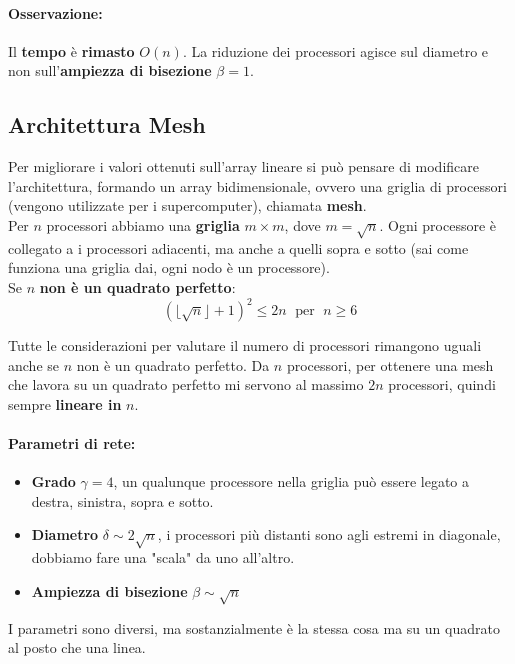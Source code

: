 \paragraph{Osservazione:} Il \textbf{tempo} è \textbf{rimasto} $O(n)$. La riduzione dei processori agisce sul diametro e non sull'\textbf{ampiezza di bisezione} $\beta = 1$.\\



\newpage

\subsection{Architettura Mesh}

Per migliorare i valori ottenuti sull'array lineare si può pensare di modificare l'architettura, formando un array bidimensionale, ovvero una griglia di processori (vengono utilizzate per i supercomputer), chiamata \textbf{mesh}.\\

Per $n$ processori abbiamo una \textbf{griglia} $m \times m$, dove $m = \sqrt n$. Ogni processore è collegato a i processori adiacenti, ma anche a quelli sopra e sotto (sai come funziona una griglia dai, ogni nodo è un processore).\\

Se $n$ \textbf{non è un quadrato perfetto}:
$$\left(\lfloor \sqrt n\rfloor + 1\right)^2 \leq 2n \; \text{ per } \; n \geq 6 $$

Tutte le considerazioni per valutare il numero di processori rimangono uguali anche se $n$ non è un quadrato perfetto. Da $n$ processori, per ottenere una mesh che lavora su un quadrato perfetto mi servono al massimo $2n$ processori, quindi sempre \textbf{lineare in} $n$.\\

\paragraph{Parametri di rete:}
\begin{itemize}
	\item \textbf{Grado} $\gamma = 4$, un qualunque processore nella griglia può essere legato a destra, sinistra, sopra e sotto.\\
	
	\item \textbf{Diametro} $\delta \sim 2\sqrt{n}$, i processori più distanti sono agli estremi in diagonale, dobbiamo fare una "scala" da uno all'altro.\\
	
	\item \textbf{Ampiezza di bisezione} $\beta \sim \sqrt{n}$
\end{itemize}
I parametri sono diversi, ma sostanzialmente è la stessa cosa ma su un quadrato al posto che una linea.\\


